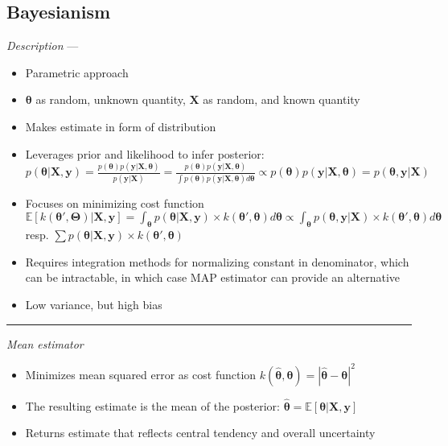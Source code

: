\subsection*{Bayesianism}
\emph{Description} --- 
\begin{itemize}
    \item Parametric approach
    \item $\boldsymbol{\theta}$ as random, unknown quantity, $\boldsymbol{X}$ as random, and known quantity
    \item Makes estimate in form of distribution
    \item Leverages prior and likelihood to infer posterior: $p(\boldsymbol{\theta}|\boldsymbol{X}, \boldsymbol{y}) = \frac{p(\boldsymbol{\theta})p(\boldsymbol{y}|\boldsymbol{X}, \boldsymbol{\theta})}{p(\boldsymbol{y}|\boldsymbol{X})} = \frac{p(\boldsymbol{\theta})p(\boldsymbol{y}|\boldsymbol{X}, \boldsymbol{\theta})}{\int p(\boldsymbol{\theta}) p(\boldsymbol{y}|\boldsymbol{X}, \boldsymbol{\theta}) d\boldsymbol{\theta}} \propto p(\boldsymbol{\theta})p(\boldsymbol{y}|\boldsymbol{X}, \boldsymbol{\theta}) = p(\boldsymbol{\theta}, \boldsymbol{y} |\boldsymbol{X})$ 
    \item Focuses on minimizing cost function $\mathbb{E}[k(\boldsymbol{\theta}',\boldsymbol{\Theta}) | \boldsymbol{X}, \boldsymbol{y}] = \int_{\boldsymbol{\theta}} p(\boldsymbol{\theta} | \boldsymbol{X}, \boldsymbol{y}) \times k(\boldsymbol{\theta}',\boldsymbol{\theta}) d\boldsymbol{\theta} \propto \int_{\boldsymbol{\theta}} p(\boldsymbol{\theta}, \boldsymbol{y} | \boldsymbol{X}) \times k(\boldsymbol{\theta}',\boldsymbol{\theta}) d\boldsymbol{\theta}$ resp. $\sum p(\boldsymbol{\theta} | \boldsymbol{X}, \boldsymbol{y}) \times k(\boldsymbol{\theta}',\boldsymbol{\theta})$
    \item Requires integration methods for normalizing constant in denominator, which can be intractable, in which case MAP estimator can provide an alternative
    \item Low variance, but high bias 
\end{itemize}

{\color{lightgray}\hrule height 0.001mm}

\emph{Mean estimator}
\begin{itemize}
    \item Minimizes mean squared error as cost function $k(\hat{\boldsymbol{\theta}},\boldsymbol{\theta}) = | \hat{\boldsymbol{\theta}} - \boldsymbol{\theta} |^2$
    \item The resulting estimate is the mean of the posterior: $\hat{\boldsymbol{\theta}} = \mathbb{E}[ \boldsymbol{\theta} | \boldsymbol{X}, \boldsymbol{y} ]$
    \item Returns estimate that reflects central tendency and overall uncertainty
\end{itemize}

